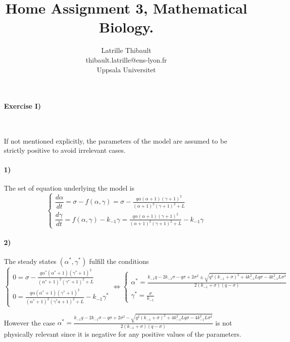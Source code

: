\documentclass{article}
\author{Latrille Thibault\\
\small thibault.latrille@ens-lyon.fr\\[-0.8ex]
\small Uppsala Universitet\\}
\title{Home Assignment 3, Mathematical Biology.}
\begin{document}
\maketitle
\paragraph{Exercise I)}
\

If not mentioned explicitly, the parameters of the model are assumed to be strictly positive to avoid irrelevant cases.
\paragraph{1)}
The set of equation underlying the model is 
$$
\left \{
\begin{array}{l}
 \dfrac{d\alpha}{dt}=\sigma-f(\alpha,\gamma)=\sigma-\frac{q\alpha  (\alpha +1) (\gamma +1)^2}{(\alpha +1)^2 (\gamma +1)^2+L} \\
  \dfrac{d\gamma}{dt}=f(\alpha,\gamma)-k_{-1}\gamma=\frac{q\alpha  (\alpha +1) (\gamma +1)^2}{(\alpha +1)^2 (\gamma +1)^2+L}-k_{-1}\gamma
    \end{array}
\right. 
$$

\paragraph{2)}
The steady states $(\alpha^*,\gamma^*)$ fulfill the conditions 
$$
\left\{
\begin{array}{l}
 0=\sigma-\frac{q\alpha^*  (\alpha^* +1) (\gamma^* +1)^2}{(\alpha^* +1)^2 (\gamma^* +1)^2+L} \\
 0=\frac{q\alpha  (\alpha^* +1) (\gamma^* +1)^2}{(\alpha^* +1)^2 (\gamma^*a +1)^2+L}-k_{-1}\gamma^*
    \end{array}
\right. 
\iff
\left\{
\begin{array}{l}
 \alpha^*=\frac{k_{-1} q-2 k_{-1} \sigma -q \sigma +2 \sigma ^2 \pm \sqrt{q^2 (k_{-1}+\sigma )^2+4 k_{-1}^2 L q \sigma -4 k_{-1}^2 L \sigma ^2}}{2 (k_{-1}+\sigma ) (q-\sigma )} \\
 \gamma^*=\frac{\sigma }{k_{-1}}
    \end{array}
\right. 
$$

However the case $\alpha^*=\frac{k_{-1} q-2 k_{-1} \sigma -q \sigma +2 \sigma ^2 - \sqrt{q^2 (k_{-1}+\sigma )^2+4 k_{-1}^2 L q \sigma -4 k_{-1}^2 L \sigma ^2}}{2 (k_{-1}+\sigma ) (q-\sigma )}$ is not physically relevant since it is negative for any positive values of the parameters. \\
\end{document}

